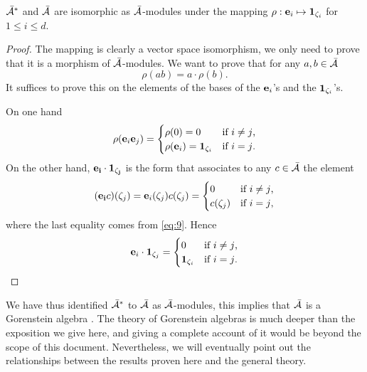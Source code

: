 \begin{proposition}
  \label{th:gorenstein}
  $\bar{\mathcal{A}}^\ast$ and $\bar{\mathcal{A}}$ are isomorphic as
  $\bar{\mathcal{A}}$-modules under the mapping
  $\rho:\mathbf{e}_i\mapsto\mathbf{1}_{\zeta_i}$ for $1\le i\le d$.
\end{proposition}
\begin{proof}
  The mapping is clearly a vector space isomorphism, we only need to
  prove that it is a morphism of $\bar{\mathcal{A}}$-modules. We want
  to prove that for any $a,b\in\bar{\mathcal{A}}$
  \[\rho(ab) = a\cdot\rho(b)\text{.}\]
  It suffices to prove this on the elements of the bases of the
  $\mathbf{e}_i$'s and the $\mathbf{1}_{\zeta_i}$'s.

  On one hand
  \begin{equation}
    \label{eq:12}
    \rho(\mathbf{e}_i\mathbf{e}_j)=
    \begin{cases}
      \rho(0)=0 &\text{if $i\ne j$,}\\
      \rho(\mathbf{e}_i)=\mathbf{1}_{\zeta_i} &\text{if $i=j$.}
    \end{cases}
  \end{equation}
  On the other hand, $\mathbf{e_i}\cdot\mathbf{1_{\zeta_j}}$ is the form
  that associates to any $c\in\bar{\mathcal{A}}$ the element
  \begin{equation}
    \label{eq:13}
    (\mathbf{e_i}c)(\zeta_j) = \mathbf{e}_i(\zeta_j)c(\zeta_j) = 
    \begin{cases}
      0 &\text{if $i\ne j$,}\\
      c(\zeta_j) &\text{if $i=j$,}
    \end{cases}
  \end{equation}
  where the last equality comes from \eqref{eq:9}. Hence
  \begin{equation}
    \label{eq:14}
    \mathbf{e}_i\cdot\mathbf{1}_{\zeta_j}=
    \begin{cases}
      0 &\text{if $i\ne j$,}\\
      \mathbf{1}_{\zeta_i} &\text{if $i=j$.}
    \end{cases}
  \end{equation}
\end{proof}

\begin{nota}
  We have thus identified $\bar{\mathcal{A}}^\ast$ to
  $\bar{\mathcal{A}}$ as $\bar{\mathcal{A}}$-modules, this implies that
  $\bar{\mathcal{A}}$ is a Gorenstein algebra \cite[Chapter
  8]{mourrain+elkadi}. The theory of Gorenstein algebras is much
  deeper than the exposition we give here, and giving a complete
  account of it would be beyond the scope of this
  document. Nevertheless, we will eventually point out the
  relationships between the results proven here and the general
  theory.
\end{nota}

